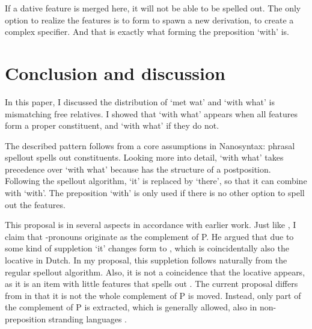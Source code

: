 \documentclass[12pt]{article}
\begin{document}
If a dative feature is merged here, it will not be able to be spelled out. The only option to realize the features is to form to spawn a new derivation, to create a complex specifier. And that is exactly what forming the preposition  `with' is.


\section{Conclusion and discussion}

In this paper, I discussed the distribution of  `met wat' and  `with what' is mismatching free relatives. I showed that  `with what' appears when all features form a proper constituent, and  `with what' if they do not.

The described pattern follows from a core assumptions in Nanosyntax: phrasal spellout spells out constituents. Looking more into detail,  `with what' takes precedence over  `with what' because  has the structure of a postposition. Following the spellout algorithm,  `it' is replaced by  `there', so that it can combine with  `with'. The preposition  `with' is only used if there is no other option to spell out the features.

This proposal is in several aspects in accordance with earlier work.
Just like \citet{riemsdijk1978}, I claim that -pronouns originate as the complement of P. He argued that due to some kind of suppletion  `it' changes form to , which is coincidentally also the locative in Dutch. In my proposal, this suppletion follows naturally from the regular spellout algorithm. Also, it is not a coincidence that the locative appears, as it is an item with little features that spells out .
The current proposal differs from \citet{riemsdijk1978} in that it is not the whole complement of P is moved. Instead, only part of the complement of P is extracted, which is generally allowed, also in non-preposition stranding languages \citep{abels2003diss}.



\printbibliography
\end{document}
